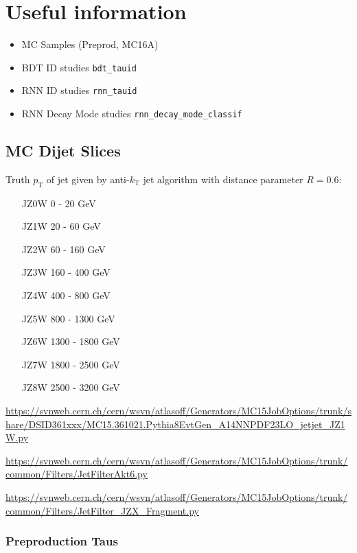 \chapter{Useful information}
\label{sec:app}

\begin{itemize}
\item MC Samples (Preprod, MC16A)
\item BDT ID studies \texttt{bdt\_tauid}
\item RNN ID studies \texttt{rnn\_tauid}
\item RNN Decay Mode studies \texttt{rnn\_decay\_mode\_classif}
\end{itemize}

\section{MC Dijet Slices}
Truth $p_\mathrm{T}$ of jet given by anti-$k_\mathrm{T}$ jet algorithm with distance parameter $R=0.6$:
\begin{itemize}
\item[JZ0W] 0 - 20 GeV
\item[JZ1W] 20 - 60 GeV
\item[JZ2W] 60 - 160 GeV
\item[JZ3W] 160 - 400 GeV
\item[JZ4W] 400 - 800 GeV
\item[JZ5W] 800 - 1300 GeV
\item[JZ6W] 1300 - 1800 GeV
\item[JZ7W] 1800 - 2500 GeV
\item[JZ8W] 2500 - 3200 GeV
\end{itemize}

\url{https://svnweb.cern.ch/cern/wsvn/atlasoff/Generators/MC15JobOptions/trunk/share/DSID361xxx/MC15.361021.Pythia8EvtGen_A14NNPDF23LO_jetjet_JZ1W.py}


\url{https://svnweb.cern.ch/cern/wsvn/atlasoff/Generators/MC15JobOptions/trunk/common/Filters/JetFilterAkt6.py}


\url{https://svnweb.cern.ch/cern/wsvn/atlasoff/Generators/MC15JobOptions/trunk/common/Filters/JetFilter_JZX_Fragment.py}

\subsection{Preproduction Taus}

